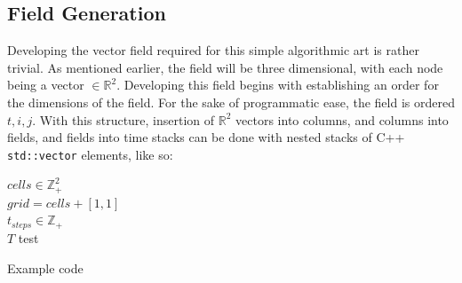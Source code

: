 \documentclass[a4paper]{article}
\begin{document}
\subsection{Field Generation}
Developing the vector field required for this simple algorithmic art is rather trivial. As mentioned earlier, the field will be three dimensional, with each node being a vector $\in \mathbb{R}^{2}$. Developing this field begins with establishing an order for the dimensions of the field. For the sake of programmatic ease, the field is ordered $t,i,j$. With this structure, insertion of $\mathbb{R}^{2}$ vectors into columns, and columns into fields, and fields into time stacks can be done with nested stacks of C++ \texttt{std::vector} elements, like so:

\begin{algorithm}[H]
  $cells \in \mathbb{Z}^{2}_{+}$\\
  $grid = cells + \left[1,1\right]$\\
  $t_{steps} \in \mathbb{Z}_{+}$\\
  $T$
  {
    {
      {
        test
      }
    }
  }

\caption{Example code}
\end{algorithm}



\end{document}

